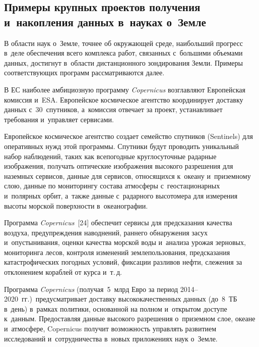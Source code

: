 \begin{multicols}{2}
\subsection{Примеры крупных проектов получения и~накопления данных в~науках 
о~Земле}

  В области наук о~Земле, точнее об окружа\-ющей среде, наибольший прогресс в~деле 
обеспечения всего комплекса работ, связанных с~большими объемами данных, достигнут 
в~области дистанционного зондирования Земли. Примеры соответст\-ву\-ющих программ 
рассматриваются далее.
  
  В ЕС наиболее амбициозную программу \textit{Copernicus} возглавляют Европейская 
комиссия и~ESA. Европейское космическое агентство координирует доставку 
данных с~30~спутников, а~комиссия отвечает за проект, устанавливает требования 
и~управляет сервисами. 
  
Европейское космическое агентство создает семейство спутников (Sentinels) для оперативных нужд этой программы. 
Спутники будут проводить уникальный набор наблюдений, таких как всепогодные 
круглосуточные радарные изоб\-ра\-же\-ния, получать оптические изображения высокого 
разрешения для наземных сервисов, данные для сервисов, относящихся к~океану 
и~приземному слою, данные по мониторингу состава атмосферы с~геостационарных 
и~полярных орбит, а~также данные с~радарного высотомера для измерения высоты 
морской поверхности в~океанографии.
  
  Программа \textit{Copernicus}~[24] обеспечит сервисы для предсказания качества 
воздуха,  пред\-упреж\-дения наводнений, раннего обнаружения засух 
и~опус\-ты\-ни\-ва\-ния, оценки качества морской воды и~анализа урожая зерновых, 
мониторинга лесов, контроля изменений землепользования, предсказания 
катастрофических погодных условий, фиксации разливов нефти, слежения за 
отклонением кораблей от курса и~т.\,д. 
  
  Программа \textit{Copernicus} (получая~5~млрд Евро за период 2014--2020~гг.)\ 
предусматривает доставку высококачественных данных (до~8~ТБ в~день) в~рамках 
политики, основанной на полном и~открытом доступе к~данным. Предоставляя данные 
высокого разрешения о~приземном слое, океане и~атмосфере, Copernicus получит 
возможность управлять развитием исследований и~сотрудничества в~новых приложениях 
наук о~Земле.
  

\end{multicols}
